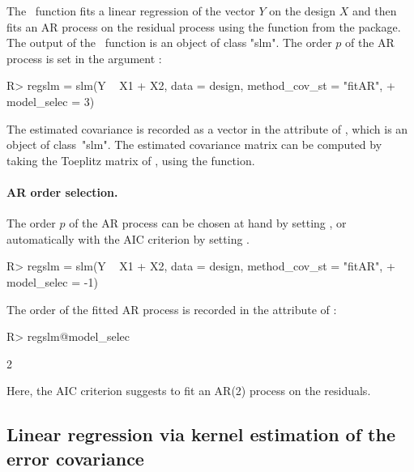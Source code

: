 The \slmf~function fits a linear regression of the vector $Y$ on the design $X$ and then fits an AR process on the residual process using the  function from the  package. The output of the \slmf~function is an object of class "slm". The order $p$ of the AR process is set in the argument :
\begin{Schunk}
\begin{Sinput}
R> regslm = slm(Y ~ X1 + X2, data = design, method_cov_st = "fitAR",
+  	model_selec = 3)
\end{Sinput}
\end{Schunk}
The estimated covariance is recorded as a vector in the attribute  of  , which is an object of class~"slm". The estimated covariance matrix can be computed by taking the Toeplitz matrix of , using the  function.

\paragraph{AR order selection.} The order $p$ of the AR process can be chosen at hand by setting , or automatically with the AIC criterion by setting .
\begin{Schunk}
\begin{Sinput}
R> regslm = slm(Y ~ X1 + X2, data = design, method_cov_st = "fitAR",
+  	model_selec = -1)
\end{Sinput}
\end{Schunk}
The order of the fitted AR process is recorded in the   attribute of :
\begin{Schunk}
\begin{Sinput}
R> regslm@model_selec
\end{Sinput}
\begin{Soutput}
[1] 2
\end{Soutput}
\end{Schunk}
Here, the AIC criterion suggests to fit an AR(2) process on the residuals.

\subsection{Linear regression via kernel estimation of the error covariance}
\label{sub:kernel_method}

